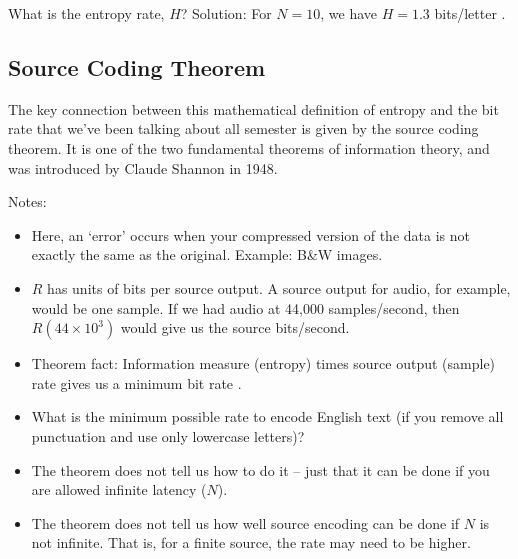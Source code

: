 {What is the entropy rate, $H$? Solution: For $N=10$, we have $H =
1.3$ bits/letter \cite[Section 6.2]{proakis2002communication}.}



\subsection{Source Coding Theorem}

The key connection between this mathematical definition of entropy
and the bit rate that we've been talking about all semester is given
by the source coding theorem.  It is one of the two fundamental
theorems of information theory, and was introduced by Claude Shannon
in 1948.


Notes:
\begin{itemize}
  \item Here, an `error' occurs when your compressed version of the
    data is not exactly the same as the original.  Example: B\&W
    images.
  \item $R$ has units of bits per source output.  A source output for audio, for example, would be one sample.  If we had audio at 44,000 samples/second, then $R(44\times 10^3)$ would give us the source bits/second.
  \item Theorem fact:  Information measure (entropy) times source output (sample) rate gives us a minimum bit rate .
  \item What is the minimum possible rate to encode English text (if you remove all punctuation and use only lowercase letters)?
  \item The theorem does not tell us how to do it -- just that it
    can be done if you are allowed infinite latency ($N$).
  \item The theorem does not tell us how well source encoding can be done if $N$ is not infinite.  That is, for a finite source, the rate may need
    to be higher.
\end{itemize}
